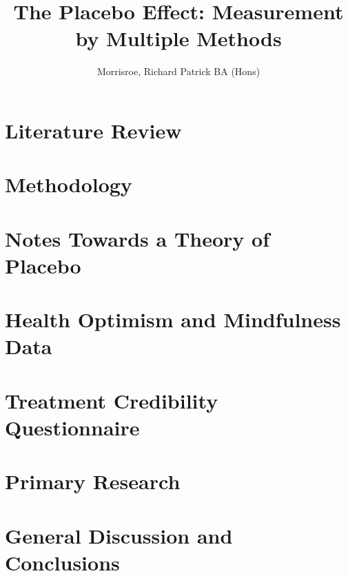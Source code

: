 \documentclass[apsych, phd]{uccthesis}
\title{The Placebo Effect: Measurement by Multiple Methods}
\author{Morrisroe, Richard Patrick BA (Hons)}
\begin{document}
\maketitle


\tableofcontents


\label{cha:intr-rese}


\chapter{Literature Review}
\label{cha:literature-review}


\chapter{Methodology}
\label{cha:methodology}



\chapter{Notes Towards a Theory of Placebo}
\label{cha:notes-towards-theory}




\chapter{Health Optimism and Mindfulness Data}
\label{cha:health-for-thesis}


\chapter{Treatment Credibility Questionnaire}
\label{cha:tcq-thesis}


% 

\chapter{Primary Research}
\label{cha:primary-research}


\chapter{General Discussion and Conclusions}
\label{cha:general-discussion}




\end{document}

